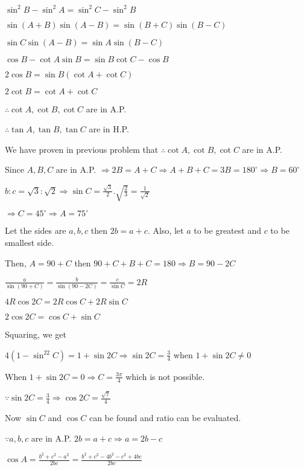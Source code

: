   $\sin^2B - \sin^2A = \sin^2C - \sin^2B$

  $\sin(A + B)\sin(A - B) = \sin(B + C)\sin(B - C)$

  $\sin C\sin(A - B) = \sin A\sin(B - C)$

  $\cos B -\cot A\sin B = \sin B\cot C - \cos B$

  $2\cos B = \sin B(\cot A + \cot C)$

  $2\cot B = \cot A + \cot C$

  $\therefore \cot A, \cot B, \cot C$ are in A.P.

  $\therefore \tan A,\tan B, \tan C$ are in H.P.

\item We have proven in previous problem that $\therefore \cot A, \cot B, \cot C$ are in A.P.

\item Since $A, B, C$ are in A.P. $\Rightarrow 2B = A + C \Rightarrow A + B + C = 3B = 180^\circ \Rightarrow B =
  60^\circ$

  $b:c = \sqrt{3}:\sqrt{2} \Rightarrow \sin C = \frac{\sqrt{3}}{2}.\sqrt{\frac{2}{3}} = \frac{1}{\sqrt{2}}$

  $\Rightarrow C = 45^\circ \Rightarrow A = 75^\circ$

\item Let the sides are $a, b, c$ then $2b = a + c.$ Also, let $a$ to be greatest and $c$ to be smallest
  side.

  Then, $A = 90 + C$ then $90 + C + B + C = 180 \Rightarrow B = 90 -2C$

  $\frac{a}{\sin(90 + C)} = \frac{b}{\sin(90 - 2C)} = \frac{c}{\sin C} = 2R$

  $4R\cos2C = 2R\cos C + 2R\sin C$

  $2\cos 2C = \cos C + \sin C$

  Squaring, we get

  $4(1 - \sin^22C) = 1 + \sin 2C \Rightarrow \sin2C = \frac{3}{4}$ when $1 + \sin 2C \neq 0$

  When $1 + \sin 2C = 0 \Rightarrow C = \frac{3\pi}{4}$ which is not possible.

  $\because \sin 2C = \frac{3}{4} \Rightarrow \cos 2C = \frac{\sqrt{7}}{4}$

  Now $\sin C$ and $\cos C$ can be found and ratio can be evaluated.

\item $\because a, b, c$ are in A.P. $2b = a + c \Rightarrow a = 2b - c$

  $\cos A = \frac{b^2 + c^2 - a^2}{2bc} = \frac{b^2 + c^2 -4b^2 -c^2 +4bc}{2bc}$


